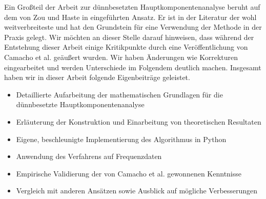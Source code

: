 Ein Großteil der Arbeit zur dünnbesetzten Hauptkomponentenanalyse beruht auf dem von Zou und Haste in \cite{zou_sparsepca} eingeführten Ansatz. Er ist in der Literatur der wohl weitverbreiteste und hat den Grundstein für eine Verwendung der Methode in der Praxis gelegt. Wir möchten an dieser Stelle darauf hinweisen, dass während der Entstehung dieser Arbeit einige Kritikpunkte durch eine Veröffentlichung von Camacho et al. \cite{camacho} geäußert wurden. Wir haben Änderungen wie Korrekturen eingearbeitet und werden Unterschiede im Folgendem deutlich machen. Insgesamt haben wir in dieser Arbeit folgende Eigenbeiträge geleistet.
\begin{itemize}
\item Detaillierte Aufarbeitung der mathematischen Grundlagen für die dünnbesetzte Hauptkomponentenanalyse
\item Erläuterung der Konstruktion und Einarbeitung von theoretischen Resultaten
\item Eigene, beschleunigte Implementierung des Algorithmus in Python
\item Anwendung des Verfahrens auf Frequenzdaten
\item Empirische Validierung der von Camacho et al. gewonnenen Kenntnisse
\item Vergleich mit anderen Ansätzen sowie Ausblick auf mögliche Verbesserungen
\end{itemize}